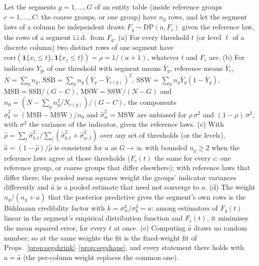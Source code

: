 \setcounter{proposition}{1724}
\begin{proposition}\label{prop:segeb}
Let the segments $g=1,\dots,G$ of an entity table (inside reference groups $c=1,\dots,C$: the coarse groups, or one group) have $n_g$ rows, and let the segment laws of a column be independent draws $F_g\sim\mathrm{DP}(a,F_c)$ given the reference law, the rows of a segment i.i.d.\ from $F_g$. (a) For every threshold $t$ (or level $\ell$ of a discrete column) two distinct rows of one segment have $\mathrm{corr}(\mathbf 1\{x_i\le t\},\mathbf 1\{x_j\le t\})=\rho=1/(a+1)$, whatever $t$ and $F_c$ are. (b) For indicators $Y_{gi}$ of one threshold with segment means $\bar Y_g$, reference means $\bar Y_c$, $N=\sum_g n_g$, $\mathrm{SSB}=\sum_g n_g(\bar Y_g-\bar Y_{c(g)})^2$, $\mathrm{SSW}=\sum_g n_g\bar Y_g(1-\bar Y_g)$, $\mathrm{MSB}=\mathrm{SSB}/(G-C)$, $\mathrm{MSW}=\mathrm{SSW}/(N-G)$ and $n_0=(N-\sum_g n_g^2/N_{c(g)})/(G-C)$, the components $\hat\sigma^2_b=(\mathrm{MSB}-\mathrm{MSW})/n_0$ and $\hat\sigma^2_w=\mathrm{MSW}$ are unbiased for $\rho\,\sigma^2$ and $(1-\rho)\,\sigma^2$, with $\sigma^2$ the variance of the indicator, given the reference laws. (c) With $\hat\rho=\sum_t\hat\sigma^2_{b,t}/\sum_t(\hat\sigma^2_{b,t}+\hat\sigma^2_{w,t})$ over any set of thresholds (or the levels), $\hat a=(1-\hat\rho)/\hat\rho$ is consistent for $a$ as $G\to\infty$ with bounded $n_g\ge2$ when the reference laws agree at those thresholds ($F_c(t)$ the same for every $c$: one reference group, or coarse groups that differ elsewhere); with reference laws that differ there, the pooled mean squares weight the groups' indicator variances differently and $\hat a$ is a pooled estimate that need not converge to $a$. (d) The weight $n_g/(n_g+a)$ that the posterior predictive gives the segment's own rows is the Bühlmann credibility factor with $k=\sigma^2_w/\sigma^2_b=a$: among estimators of $F_g(t)$ linear in the segment's empirical distribution function and $F_c(t)$, it minimises the mean squared error, for every $t$ at once. (e) Computing $\hat a$ draws no random number; so at the same weights the fit is the fixed-weight fit of Props.~\ref{prop:segshrink}--\ref{prop:segshape}, and every statement there holds with $a=\hat a$ (the per-column weight replaces the common one).
\end{proposition}
